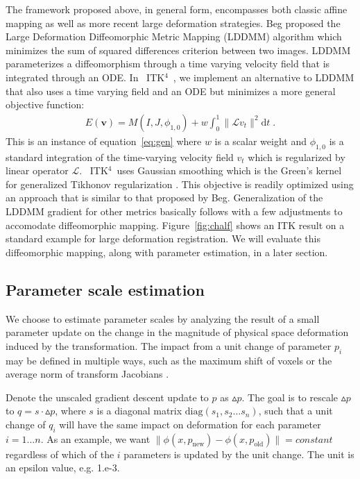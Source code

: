 \documentclass{frontiersSCNS}
\newcommand{\vect}[1]{\mathbf{#1}}
\renewcommand{\v}{\vect{v}}
\newcommand{\myphi}{\phi}
\newcommand{\dd}{\text{d}}
\newcommand{\myE}{E}
\newcommand{\opL}{\mathcal{L}}
\newcommand{\tk}{~ITK$^{\text{4}}$~}
\begin{document}
The framework proposed above, in general form, encompasses both
classic affine mapping as well as more recent large deformation
strategies.  Beg proposed the Large Deformation Diffeomorphic Metric Mapping
(LDDMM) algorithm \cite{Miller2005} which minimizes the sum of squared differences
criterion between two images.  LDDMM parameterizes a
diffeomorphism through a time varying velocity field that is
integrated through an ODE.  In \tk, we implement an alternative
to LDDMM that also uses a time varying field and an ODE but minimizes
a more general objective function:
\begin{align}
\myE(\v) = M(I,J,\myphi_{1,0})
+  w \int_{0}^{1} \| \opL v_t\|^2 \dd t \;.
\label{eq:lddmm}
\end{align}
This is an instance of equation~\ref{eq:gen} where $w$ is a scalar
weight and $\myphi_{1,0}$ is a standard integration of the
time-varying velocity field $v_t$ which is regularized by linear
operator $\opL$.  \tk uses Gaussian smoothing which is the Green's
kernel for generalized Tikhonov regularization \cite{Nielsen1997}.
This objective is readily optimized using an approach that is similar
to that proposed by Beg.  Generalization of the LDDMM gradient 
for other metrics basically follows \cite{hermosillo} with a few
adjustments to accomodate diffeomorphic mapping.
Figure~\ref{fig:chalf} shows an ITK result on a standard example for
large deformation registration.  We will evaluate this diffeomorphic
mapping, along with parameter estimation, in a later section.

\subsection{Parameter scale estimation}
We choose to estimate parameter scales by analyzing the result of a
small parameter update on the change in the magnitude of physical space deformation
induced by the transformation.  The impact from a unit change of
parameter $p_i$ may be defined in multiple ways, such as the maximum shift of
voxels or the average norm of transform Jacobians \cite{Jenkinson2001}.

Denote the unscaled gradient descent update to $p$ as $\vartriangle
p$.  The goal is to rescale $\vartriangle p$ to $q = s \cdot \vartriangle p$, where $s$ is a diagonal
matrix $\text{diag} (s_1, s_2 \ldots s_n)$, such that a unit change of $q_i$ will have
the same impact on deformation for each parameter $i = 1... n$.   
As an example, we want $ \| \phi(x,p_{\text{new}}) -
\phi(x,p_\text{old}) \| = constant $ regardless of which of the
$i$ parameters is updated by the unit change.  The unit is an epsilon
value, e.g. 1.e-3.
\end{document}
